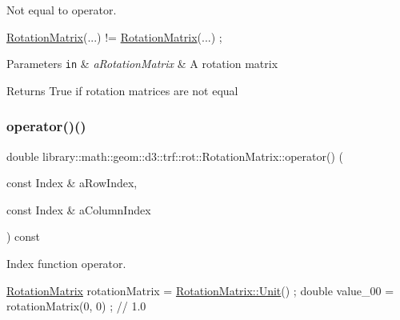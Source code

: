 Not equal to operator. 


\begin{DoxyCode}
\hyperlink{classlibrary_1_1math_1_1geom_1_1d3_1_1trf_1_1rot_1_1_rotation_matrix_a7f1184694020cb4f963d58931324ab06}{RotationMatrix}(...) != \hyperlink{classlibrary_1_1math_1_1geom_1_1d3_1_1trf_1_1rot_1_1_rotation_matrix_a7f1184694020cb4f963d58931324ab06}{RotationMatrix}(...) ;
\end{DoxyCode}



\begin{DoxyParams}[1]{Parameters}
\mbox{\tt in}  & {\em a\+Rotation\+Matrix} & A rotation matrix \\
\hline
\end{DoxyParams}
\begin{DoxyReturn}{Returns}
True if rotation matrices are not equal 
\end{DoxyReturn}
\mbox{\label{classlibrary_1_1math_1_1geom_1_1d3_1_1trf_1_1rot_1_1_rotation_matrix_ad4a32ff81978cb60f2034661ea00d390}} 
\subsubsection{\texorpdfstring{operator()()}{operator()()}\hspace{0.1cm}{\footnotesize\ttfamily [1/2]}}
{\footnotesize\ttfamily double library\+::math\+::geom\+::d3\+::trf\+::rot\+::\+Rotation\+Matrix\+::operator() (\begin{DoxyParamCaption}\item[{const Index \&}]{a\+Row\+Index,  }\item[{const Index \&}]{a\+Column\+Index }\end{DoxyParamCaption}) const}



Index function operator. 


\begin{DoxyCode}
\hyperlink{classlibrary_1_1math_1_1geom_1_1d3_1_1trf_1_1rot_1_1_rotation_matrix_a7f1184694020cb4f963d58931324ab06}{RotationMatrix} rotationMatrix = \hyperlink{classlibrary_1_1math_1_1geom_1_1d3_1_1trf_1_1rot_1_1_rotation_matrix_aeb5324151ee55348fa16c5fe78b036ed}{RotationMatrix::Unit}() ;
\textcolor{keywordtype}{double} value\_00 = rotationMatrix(0, 0) ; \textcolor{comment}{// 1.0}
\end{DoxyCode}



